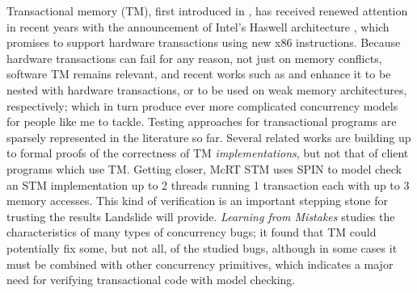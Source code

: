 Transactional memory (TM), first introduced in \cite{transactional-memory},
has received renewed attention in recent years with the announcement of Intel's Haswell architecture \cite{htm-haswell},
which promises to support hardware transactions using new x86 instructions.
Because hardware transactions can fail for any reason, not just on memory conflicts,
software TM remains relevant,
and recent works such as \cite{hybrid-htm-stm} and \cite{stm-relaxed-memory} enhance it to be nested with hardware transactions, or to be used on weak memory architectures, respectively;
which in turn produce ever more complicated concurrency models for people like me to tackle.
%
Testing approaches for transactional programs are sparsely represented in the literature so far.
Several related works \cite{tm-correctness,tm-completeness,specifying-verifying-tm} are building up to formal proofs of the correctness of TM {\em implementations},
but not that of client programs which use TM.
Getting closer, McRT STM \cite{mc-tm-with-spin} uses SPIN \cite{spin} to model check an STM implementation
up to 2 threads running 1 transaction each with up to 3 memory accesses.
This kind of verification is an important stepping stone for trusting the results Landslide will provide.
%
{\em Learning from Mistakes} \cite{learning-from-mistakes} studies the characteristics of many types of concurrency bugs;
it found that TM could potentially fix some, but not all, of the studied bugs,
although in some cases it must be combined with other concurrency primitives,
which indicates a major need for verifying transactional code with model checking.
